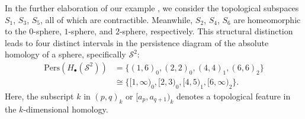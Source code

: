 \begin{example}
    In the further elaboration of our example \cite[\S 2.3, Example]{de2011dualities}, we consider the topological subspaces $S_{1}$,
    $S_{3}$, $S_{5}$, all of which are contractible. Meanwhile,
    $S_{2}$, $S_{4}$, $S_{6}$ are homeomorphic to the $0$-sphere, $1$-sphere, and $2$-sphere,
    respectively. This structural distinction leads to four distinct intervals in
    the persistence diagram of the absolute homology of a sphere, specifically $\mathcal{S}^{2}$:
    \begin{align}
        \mathrm{Pers}(H_{\bullet}(\mathcal{S}^{2})) & = \{(1,6)_{0}, (2,2)_{0}, (4,4)_{1}, (6,6)_{2} \}             \\
                                                    & \cong \{[1,\infty)_{0}, [2,3)_{0}, [4,5)_{1}, [6, \infty)_{2} \}.
    \end{align}
    Here, the subscript $k$ in $(p,q)_{k}$ or $[a_{p}, a_{q+1})_{k}$ denotes a topological
    feature in the $k$-dimensional homology.
\end{example}

